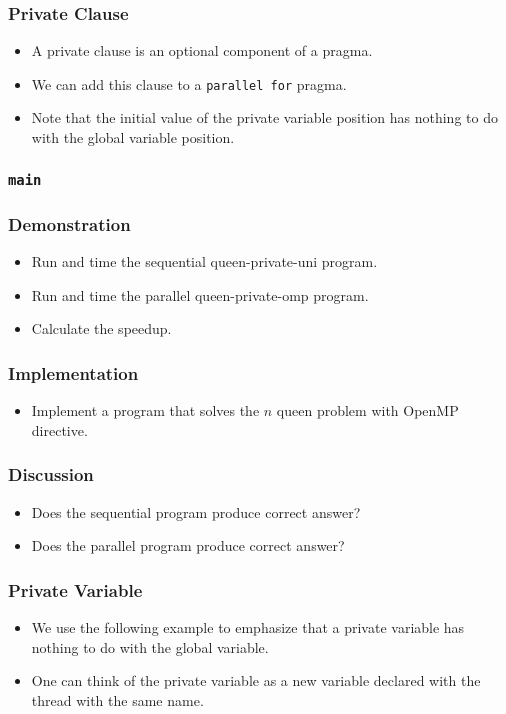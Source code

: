 \documentclass{beamer}
\begin{document}
\begin{frame}
\frametitle{Private Clause}
\begin{itemize}
\item A private clause is an optional component of a pragma.
\item We can add this clause to a {\tt parallel for} pragma.
\item Note that the initial value of the private variable position
 has nothing to do with the global variable position.
\end{itemize}
\end{frame}


\begin{frame}
\frametitle{\tt main} 
\end{frame}

\begin{frame}
\frametitle{Demonstration}
\begin{itemize}
\item Run and time the sequential queen-private-uni program.
\item Run and time the parallel queen-private-omp program.
\item Calculate the speedup.
\end{itemize}
\end{frame}

\begin{frame}
\frametitle{Implementation}
\begin{itemize}
\item Implement a program that solves the $n$ queen problem with
  OpenMP directive.
\end{itemize}
\end{frame}

\begin{frame}
\frametitle{Discussion}
\begin{itemize}
\item Does the sequential program produce correct answer?
\item Does the parallel program produce correct answer?
\end{itemize}
\end{frame}


\begin{frame}
\frametitle{Private Variable}
\begin{itemize}
\item We use the following example to emphasize that a private variable has nothing to do with the global variable.
\item One can think of the private variable as a new variable declared
  with the thread with the same name.
\end{itemize}
\end{frame}
\end{document}
